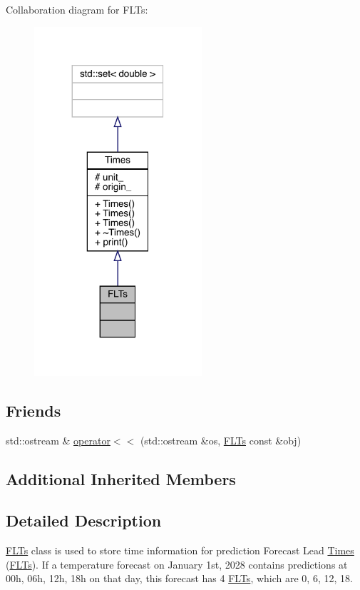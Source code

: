 Collaboration diagram for F\+L\+Ts\+:
\nopagebreak
\begin{figure}[H]
\begin{center}
\leavevmode
\includegraphics[width=176pt]{class_f_l_ts__coll__graph}
\end{center}
\end{figure}
\subsection*{Friends}
\begin{DoxyCompactItemize}
\item 
std\+::ostream \& \mbox{\hyperlink{class_f_l_ts_ae6eedde5f18b77e7a2922bc9a3f6b8bf}{operator$<$$<$}} (std\+::ostream \&os, \mbox{\hyperlink{class_f_l_ts}{F\+L\+Ts}} const \&obj)
\end{DoxyCompactItemize}
\subsection*{Additional Inherited Members}


\subsection{Detailed Description}
\mbox{\hyperlink{class_f_l_ts}{F\+L\+Ts}} class is used to store time information for prediction Forecast Lead \mbox{\hyperlink{class_times}{Times}} (\mbox{\hyperlink{class_f_l_ts}{F\+L\+Ts}}). If a temperature forecast on January 1st, 2028 contains predictions at 00h, 06h, 12h, 18h on that day, this forecast has 4 \mbox{\hyperlink{class_f_l_ts}{F\+L\+Ts}}, which are 0, 6, 12, 18. 

